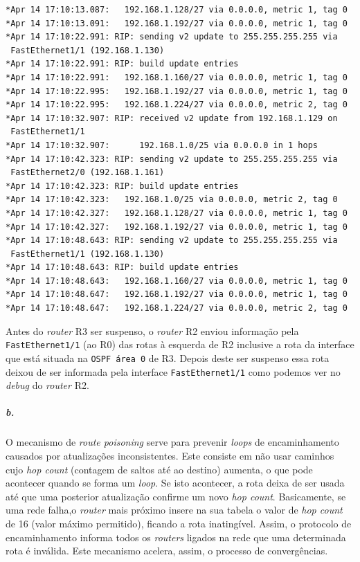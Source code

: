 \begin{verbatim}
*Apr 14 17:10:13.087: 	192.168.1.128/27 via 0.0.0.0, metric 1, tag 0
*Apr 14 17:10:13.091: 	192.168.1.192/27 via 0.0.0.0, metric 1, tag 0
*Apr 14 17:10:22.991: RIP: sending v2 update to 255.255.255.255 via
 FastEthernet1/1 (192.168.1.130)
*Apr 14 17:10:22.991: RIP: build update entries
*Apr 14 17:10:22.991: 	192.168.1.160/27 via 0.0.0.0, metric 1, tag 0
*Apr 14 17:10:22.995: 	192.168.1.192/27 via 0.0.0.0, metric 1, tag 0
*Apr 14 17:10:22.995: 	192.168.1.224/27 via 0.0.0.0, metric 2, tag 0
*Apr 14 17:10:32.907: RIP: received v2 update from 192.168.1.129 on
 FastEthernet1/1
*Apr 14 17:10:32.907:      192.168.1.0/25 via 0.0.0.0 in 1 hops
*Apr 14 17:10:42.323: RIP: sending v2 update to 255.255.255.255 via
 FastEthernet2/0 (192.168.1.161)
*Apr 14 17:10:42.323: RIP: build update entries
*Apr 14 17:10:42.323: 	192.168.1.0/25 via 0.0.0.0, metric 2, tag 0
*Apr 14 17:10:42.327: 	192.168.1.128/27 via 0.0.0.0, metric 1, tag 0
*Apr 14 17:10:42.327: 	192.168.1.192/27 via 0.0.0.0, metric 1, tag 0
*Apr 14 17:10:48.643: RIP: sending v2 update to 255.255.255.255 via
 FastEthernet1/1 (192.168.1.130)
*Apr 14 17:10:48.643: RIP: build update entries
*Apr 14 17:10:48.643: 	192.168.1.160/27 via 0.0.0.0, metric 1, tag 0
*Apr 14 17:10:48.647: 	192.168.1.192/27 via 0.0.0.0, metric 1, tag 0
*Apr 14 17:10:48.647: 	192.168.1.224/27 via 0.0.0.0, metric 2, tag 0
\end{verbatim}

Antes do \emph{router} \textsf{R3} ser suspenso, o \emph{router} \textsf{R2} enviou informação pela \texttt{FastEthernet1/1} (ao \textsf{R0}) das rotas à esquerda de \textsf{R2} inclusive a rota da interface que está situada na \texttt{OSPF área 0} de \textsf{R3}. Depois deste ser suspenso essa rota deixou de ser informada pela interface \texttt{FastEthernet1/1} como podemos ver no \emph{debug} do \emph{router} \textsf{R2}.
 
\subparagraph{b.}
O mecanismo de \emph{route poisoning} serve para prevenir \emph{loops} de encaminhamento causados por atualizações inconsistentes. Este consiste em não usar caminhos cujo \emph{hop count} (contagem de saltos até ao destino) aumenta, o que pode acontecer quando se forma um \emph{loop}. Se isto acontecer, a rota deixa de ser usada até que uma posterior atualização confirme um novo \emph{hop count}. Basicamente, se uma rede falha,o \emph{router} mais próximo insere na sua tabela o valor de \emph{hop count} de 16 (valor máximo permitido), ficando a rota inatingível. Assim, o protocolo de encaminhamento informa todos os \emph{routers} ligados na rede que uma determinada rota é inválida. Este mecanismo acelera, assim, o processo de convergências. 
 
